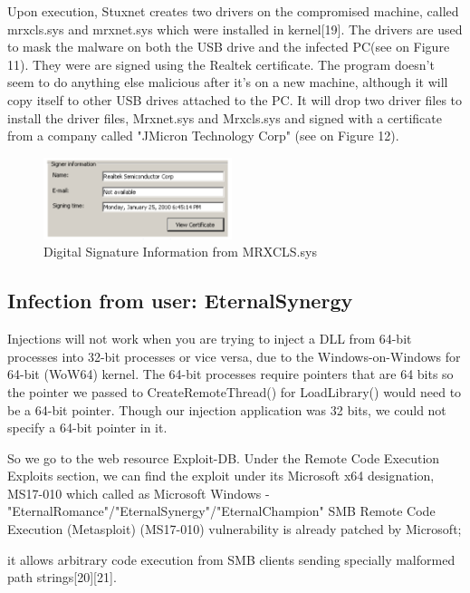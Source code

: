 \documentclass[conference]{IEEEtran}
\begin{document}
Upon execution, Stuxnet creates two drivers on the compromised machine, called mrxcls.sys and mrxnet.sys which were installed in kernel[19]. The drivers are used to mask the malware on both the USB drive and the infected PC(see on Figure 11). They were are signed using the Realtek certificate. The program doesn’t seem to do anything else malicious after it’s on a new machine, although it will copy itself to other USB drives attached to the PC. It will drop two driver files to install the driver files, Mrxnet.sys and Mrxcls.sys and signed with a certificate from a company called "JMicron Technology Corp" (see on Figure 12).
\begin{figure}[!htb]
	\includegraphics[width=0.49\textwidth]{images/realtek.PNG}
	\caption{ Digital Signature Information from MRXCLS.sys %
	}
	\label{fig:fb}
\end{figure}

\subsection{Infection from user: EternalSynergy}

Injections  will not work when you are trying to inject a DLL from 64-bit processes into 32-bit processes or vice versa, due to the Windows-on-Windows for 64-bit (WoW64) kernel. The 64-bit processes require pointers that are 64 bits so the pointer we passed to CreateRemoteThread() for LoadLibrary() would need to be a 64-bit pointer. Though our injection application was 32 bits, we could not specify a 64-bit pointer in it.



So we go to the web resource Exploit-DB. Under the Remote Code Execution Exploits section, we can find the exploit under its Microsoft x64 designation, MS17-010 which called as Microsoft Windows -"EternalRomance"/"EternalSynergy"/"EternalChampion" SMB Remote Code Execution (Metasploit) (MS17-010) vulnerability is already patched by Microsoft;

it allows arbitrary code execution from SMB clients sending specially malformed path strings[20][21].
\end{document}
